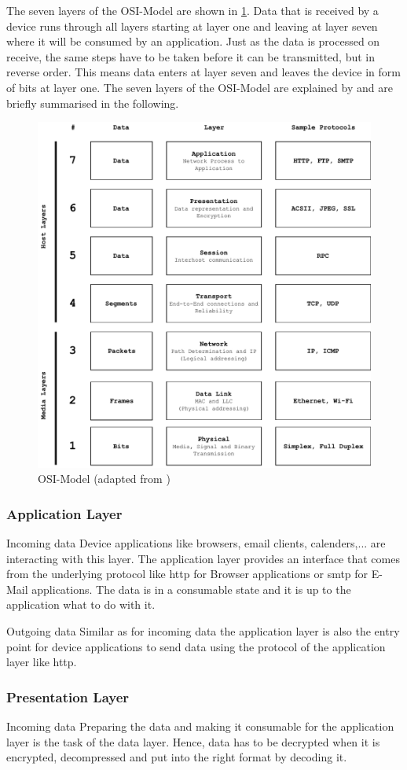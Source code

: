 The seven layers of the OSI-Model are shown in \cref{fig:osimodel}. Data that is received by a device runs through all layers starting at layer one and leaving at layer seven where it will be consumed by an application. Just as the data is processed on receive, the same steps have to be taken before it can be transmitted, but in reverse order. This means data enters at layer seven and leaves the device in form of bits at layer one.
The seven layers of the OSI-Model are explained by \citet{osi-model-explained} and are briefly summarised in the following.

\begin{figure}
\centering
\includegraphics[width=.5\textwidth]{graphics/osi-modell.pdf}
\caption{OSI-Model (adapted from \citet{wiki:osi-model})}
\label{fig:osimodel}
\end{figure}

\subsubsection{Application Layer}
Incoming data\newline
Device applications like browsers, email clients, calenders,... are interacting with this layer. The application layer provides an interface that comes from the underlying protocol like \gls{http} for Browser applications or \gls{smtp} for E-Mail applications. The data is in a consumable state and it is up to the application what to do with it.

Outgoing data\newline
Similar as for incoming data the application layer is also the entry point for device applications to send data using the protocol of the application layer like \gls{http}. 


\subsubsection{Presentation Layer}
Incoming data\newline
Preparing the data and making it consumable for the application layer is the task of the data layer. 
Hence, data has to be decrypted when it is encrypted, decompressed and put into the right format by decoding it.

